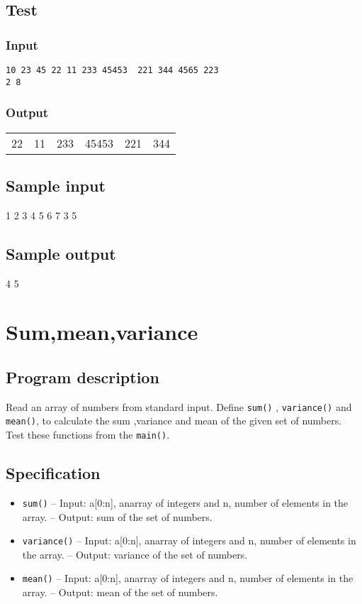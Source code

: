 \documentclass[11pt]{article}
\begin{document}
\subsection*{Test}
\label{sec-3-4}
\subsubsection*{Input}
\label{sec-3-4-1}
\begin{verbatim}
10 23 45 22 11 233 45453  221 344 4565 223  
2 8
\end{verbatim}
\subsubsection*{Output}
\label{sec-3-4-2}
\begin{center}
\begin{tabular}{rrrrrr}
22 & 11 & 233 & 45453 & 221 & 344\\
\end{tabular}
\end{center}

\subsection*{Sample input}
\label{sec-3-5}
1 2 3 4 5 6 7 
3 5

\subsection*{Sample output}
\label{sec-3-6}
4 5

\section{Sum,mean,variance}
\label{sec-4}
\subsection*{Program description}
\label{sec-4-1}
Read an array of numbers from standard input.
Define \texttt{sum()} , \texttt{variance()} and \texttt{mean()}, to calculate
the sum ,variance and mean of the given set of numbers.
Test these functions from the \texttt{main()}.
\subsection*{Specification}
\label{sec-4-2}
\begin{itemize}
\item \texttt{sum()}
-- Input: a[0:n], anarray of integers and n, number of elements 
   in the array.
-- Output: sum of the set of numbers.
\item \texttt{variance()}
-- Input: a[0:n], anarray of integers and n, number of elements 
   in the array.
-- Output: variance of the set of numbers.
\item \texttt{mean()}
-- Input: a[0:n], anarray of integers and n, number of elements 
   in the array.
-- Output: mean of the set of numbers.
\end{itemize}
\end{document}
